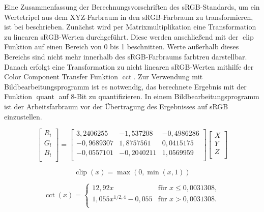 \documentclass[10pt,a4paper,DIV=12,parskip=half]{scrarticle}
\begin{document}
Eine Zusammenfassung der Berechnungsvorschriften des sRGB-Standards, um ein Wertetripel aus dem XYZ-Farbraum in den sRGB-Farbraum zu transformieren, ist bei \cite{W3C2015} beschrieben. Zunächst wird per Matrixmultiplikation eine Transformation zu linearen sRGB-Werten durchgeführt. Diese werden anschließend mit der $\operatorname{clip}$ Funktion auf einen Bereich von 0 bis 1 beschnitten. Werte außerhalb dieses Bereichs sind nicht mehr innerhalb des sRGB-Farbraums farbtreu darstellbar. Danach erfolgt eine Transformation zu nicht linearen sRGB-Werten mithilfe der Color Component Transfer Funktion $\operatorname{cct}$. Zur Verwendung mit Bildbearbeitungsprogramm ist es notwendig, das berechnete Ergebnis mit der Funktion $\operatorname{quant}$ auf 8-Bit zu quantifizieren. In einem Bildbearbeitungsprogramm ist der Arbeitsfarbraum vor der Übertragung des Ergebnisses auf sRGB einzustellen.

\begin{equation*}
\begin{bmatrix}
R_{l} \\
G_{l} \\
B_{l} \\
\end{bmatrix} =
\begin{bmatrix}
3,2406255 & -1,537208 & -0,4986286 \\
-0,9689307 & 1,8757561 & 0,0415175 \\
-0,0557101 & -0,2040211 & 1,0569959 \\
\end{bmatrix}
\begin{bmatrix}
X \\
Y \\
Z \\
\end{bmatrix}
\end{equation*}

\begin{equation*}
\operatorname{clip}(x)=\operatorname{max}(0, \operatorname{min}(x, 1))
\end{equation*}

\begin{equation*}
\operatorname{cct}(x)=
\begin{cases}
12,92 x & \text{für } x \leq 0,0031308, \\
1,055 x^{1/2,4} - 0,055 & \text{für } x > 0,0031308. \\
\end{cases}
\end{equation*}
\end{document}
